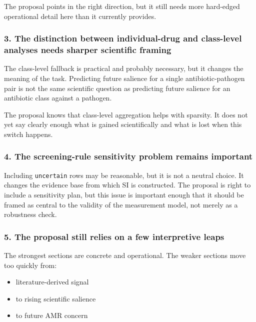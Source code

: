 The proposal points in the right direction, but it still needs more
hard-edged operational detail here than it currently provides.

\subsubsection{3. The distinction between individual-drug and
class-level analyses needs sharper scientific
framing}\label{the-distinction-between-individual-drug-and-class-level-analyses-needs-sharper-scientific-framing}

The class-level fallback is practical and probably necessary, but it
changes the meaning of the task. Predicting future salience for a single
antibiotic-pathogen pair is not the same scientific question as
predicting future salience for an antibiotic class against a pathogen.

The proposal knows that class-level aggregation helps with sparsity. It
does not yet say clearly enough what is gained scientifically and what
is lost when this switch happens.

\subsubsection{4. The screening-rule sensitivity problem remains
important}\label{the-screening-rule-sensitivity-problem-remains-important}

Including \texttt{uncertain} rows may be reasonable, but it is not a
neutral choice. It changes the evidence base from which SI is
constructed. The proposal is right to include a sensitivity plan, but
this issue is important enough that it should be framed as central to
the validity of the measurement model, not merely as a robustness check.

\subsubsection{5. The proposal still relies on a few interpretive
leaps}\label{the-proposal-still-relies-on-a-few-interpretive-leaps}

The strongest sections are concrete and operational. The weaker sections
move too quickly from:

\begin{itemize}
\tightlist
\item
  literature-derived signal
\item
  to rising scientific salience
\item
  to future AMR concern
\end{itemize}

